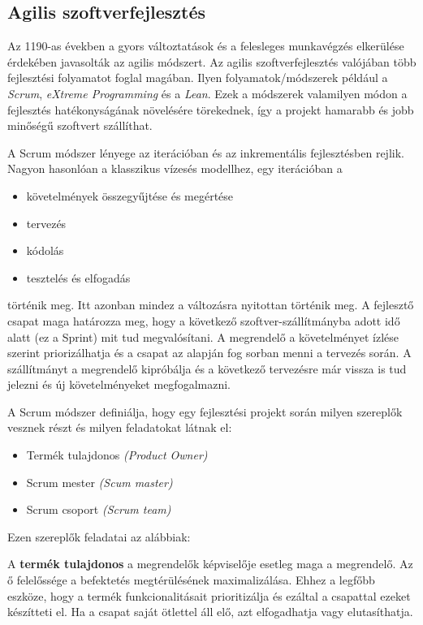 \documentclass[a4paper,12pt,leqno, notitlepage]{article}%
\begin{document}
\subsection{Agilis szoftver\-fejlesztés}

Az 1190-as években a gyors változtatások és a felesleges munkavégzés elkerülése érdekében javasolták az agilis módszert. Az agilis szoftver\-fejlesztés valójában több fejlesztési folyamatot foglal magában. Ilyen folyamatok/módszerek például a \emph{Scrum}, \emph{eXtreme Programming} és a \emph{Lean}.\cite{agile} Ezek a módszerek valamilyen módon a fejlesztés hatékonyságának növelésére törekednek, így a projekt hamarabb és jobb minőségű szoftvert szállíthat.

A Scrum módszer lényege az iterációban és az inkrementális fejlesztésben rejlik. Nagyon hasonlóan a klasszikus vízesés modellhez, egy iterációban a 
\begin{itemize}
	\item követelmények összegyűjtése és megértése
	\item tervezés
	\item kódolás
	\item tesztelés és elfogadás
\end{itemize}
történik meg. Itt azonban mindez a változásra nyitottan történik meg. A fejlesztő csapat maga határozza meg, hogy a következő szoftver-szállítmányba adott idő alatt (ez a Sprint)  mit tud megvalósítani. A megrendelő a követelményet ízlése szerint priorizálhatja és a csapat az alapján fog sorban menni  a tervezés során. A szállítmányt a megrendelő kipróbálja és a következő tervezésre már vissza is tud jelezni és új követelményeket megfogalmazni.

A Scrum módszer definiálja, hogy egy fejlesztési projekt során milyen szereplők vesznek részt és milyen feladatokat látnak el:

\begin{itemize}
	\item Termék tulajdonos \emph{(Product Owner)}
	\item Scrum mester \emph{(Scum master)}
	\item Scrum csoport \emph{(Scrum team)}
\end{itemize}

Ezen szereplők feladatai az alábbiak:

A \textbf{termék tulajdonos} a megrendelők képviselője esetleg maga a megrendelő. Az ő felelőssége a befektetés megtérülésének maximalizálása. Ehhez a legfőbb eszköze, hogy a termék funkcionalitásait prioritizálja és ezáltal a csapattal ezeket készítteti el. Ha a csapat saját ötlettel áll elő, azt elfogadhatja vagy elutasíthatja. \cite{scrum_roles}
\end{document}
